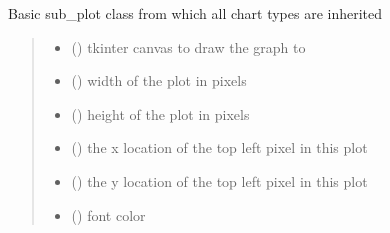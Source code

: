 \documentclass[letterpaper,10pt,english]{sphinxmanual}
\begin{document}
\begin{fulllineitems}
\sphinxAtStartPar
Basic sub\_plot class from which all chart types are inherited
\begin{quote}\begin{description}
\begin{itemize}
\item {} 
\sphinxAtStartPar
{} () \textendash{} tkinter canvas to draw the graph to

\item {} 
\sphinxAtStartPar
{} () \textendash{} width of the plot in pixels

\item {} 
\sphinxAtStartPar
{} () \textendash{} height of the plot in pixels

\item {} 
\sphinxAtStartPar
{} () \textendash{} the x location of the top left pixel in this plot

\item {} 
\sphinxAtStartPar
{} () \textendash{} the y location of the top left pixel in this plot

\item {} 
\sphinxAtStartPar
{} () \textendash{} font color

\end{itemize}

\end{description}\end{quote}

\begin{fulllineitems}
\label{\detokenize{index:sjvisualizer.Canvas.sub_plot.load_image}}
\pysigstartsignatures
{}
\pysigstopsignatures
\end{fulllineitems}


\end{fulllineitems}
\end{document}
